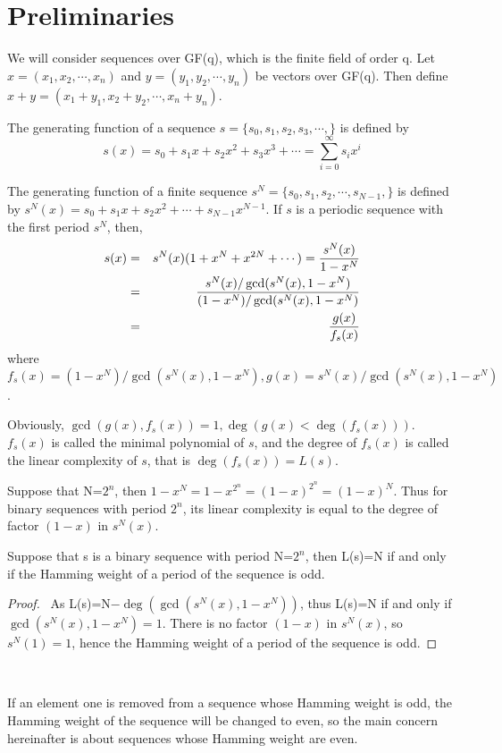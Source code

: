 \documentclass[10pt,conference,twocolumn]{IEEEtran}
\begin{document}
\section{Preliminaries}

We will consider sequences over GF(q), which is the finite field of
order q. Let $x=(x_1,x_2,\cdots,x_n)$ and $y=(y_1,y_2,\cdots,y_n)$
be vectors over GF(q). Then define
$x+y=(x_1+y_1,x_2+y_2,\cdots,x_n+y_n)$.

The generating function of a sequence $s=\{s_0, s_1, s_2, s_3,
\cdots, \}$  is defined by $$s(x)=s_0+ s_1x+ s_2x^2+ s_3x^3+
\cdots=\sum\limits^\infty_{i=0}s_ix^i$$

The generating function of a finite sequence $s^N=\{s_0, s_1, s_2,
 \cdots, s_{N-1},\}$ is defined by $s^N(x)=s_0+ s_1x+ s_2x^2+
\cdots+s_{N-1}x^{N-1}$. If $s$ is a periodic sequence with the first
period $s^N$, then,
\begin{eqnarray}
s(x) &=& s^N(x)(1+ x^N+ x^{2N}+ \cdots)=\frac{s^N(x)}{1-x^N}\notag\\
&=&\frac{s^N(x)/\gcd(s^N(x),1-x^N)}{(1-x^N)/\gcd(s^N(x),1-x^N)}\notag\\
&=&\frac{g(x)}{f_s(x)}\label{formula01}
\end{eqnarray}
where $f_s(x)=(1-x^N)/\gcd(s^N(x),1-x^N),
g(x)=s^N(x)/\gcd(s^N(x),1-x^N)$.

Obviously, $\gcd(g(x),f_s(x))=1, \deg(g(x)<\deg(f_s(x)))$. $f_s(x)$
is called  the minimal polynomial of $s$, and the degree of $f_s(x)$
is called the linear complexity of $s$, that is $\deg(f_s(x))=L(s)$.


Suppose that N=$2^n$, then $1-x^N=1-x^{2^n}=(1-x)^{2^n}=(1-x)^N$.
Thus for binary sequences with period $2^n$, its linear complexity
is equal to the degree of factor $(1-x)$ in $s^N(x)$.



 Suppose that s is a binary sequence with
period N=$2^n$, then L(s)=N if and only if the Hamming weight of a
period of the sequence is odd.


\begin{proof}\
 As  L(s)=N$-\deg(\gcd(s^N(x),1-x^N))$, thus L(s)=N if and only if $\gcd(s^N(x),1-x^N)=1$.
  There is no factor $(1-x)$ in $s^N(x)$, so $s^N(1)=1$, hence the Hamming weight of a period of the sequence is odd.
\end{proof}\

If an element one is removed from a sequence whose Hamming weight is
odd, the Hamming weight of the sequence will be changed to even, so
the main concern hereinafter is about sequences whose Hamming weight
are even.
\end{document}
